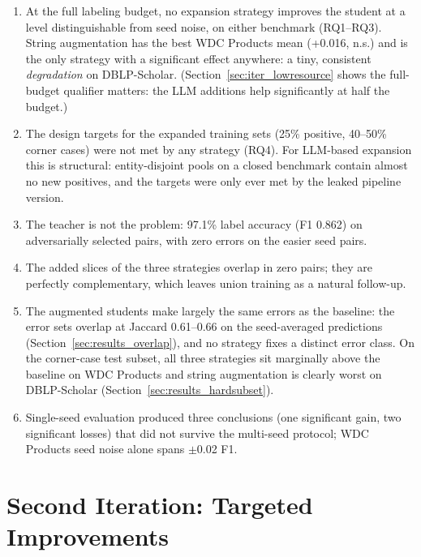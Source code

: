 \documentclass[a4paper,oneside,bibliography=totoc]{scrbook}
\begin{document}
\begin{enumerate}
\item At the full labeling budget, no expansion strategy improves the student at a level distinguishable from seed noise, on either benchmark (RQ1--RQ3). String augmentation has the best WDC Products mean (+0.016, n.s.) and is the only strategy with a significant effect anywhere: a tiny, consistent \emph{degradation} on DBLP-Scholar. (Section~\ref{sec:iter_lowresource} shows the full-budget qualifier matters: the LLM additions help significantly at half the budget.)
\item The design targets for the expanded training sets (25\% positive, 40--50\% corner cases) were not met by any strategy (RQ4). For LLM-based expansion this is structural: entity-disjoint pools on a closed benchmark contain almost no new positives, and the targets were only ever met by the leaked pipeline version.
\item The teacher is not the problem: 97.1\% label accuracy (F1 0.862) on adversarially selected pairs, with zero errors on the easier seed pairs.
\item The added slices of the three strategies overlap in zero pairs; they are perfectly complementary, which leaves union training as a natural follow-up.
\item The augmented students make largely the same errors as the baseline: the error sets overlap at Jaccard 0.61--0.66 on the seed-averaged predictions (Section~\ref{sec:results_overlap}), and no strategy fixes a distinct error class. On the corner-case test subset, all three strategies sit marginally above the baseline on WDC Products and string augmentation is clearly worst on DBLP-Scholar (Section~\ref{sec:results_hardsubset}).
\item Single-seed evaluation produced three conclusions (one significant gain, two significant losses) that did not survive the multi-seed protocol; WDC Products seed noise alone spans $\pm$0.02 F1.
\end{enumerate}

\chapter{Second Iteration: Targeted Improvements}
\label{ch:iteration}
\end{document}
